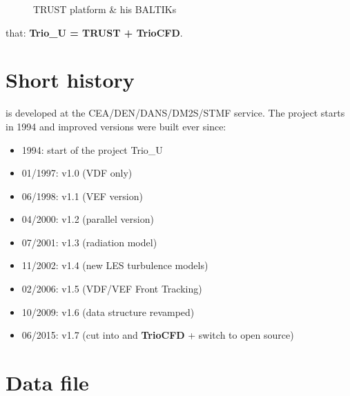 \begin{figure}[h!]
\begin{center}
\caption{TRUST platform \& his BALTIKs}
\label{TRUST}
\end{center}
\end{figure}

\Note that: \textbf{Trio\_U = TRUST + TrioCFD}.



\section{Short history}

\trust is developed at the CEA/DEN/DANS/DM2S/STMF service.
The project starts in 1994 and improved versions were built ever since:
\begin{itemize}
\item 1994: start of the project Trio\_U
\item 01/1997: v1.0 (VDF only)
\item 06/1998: v1.1 (VEF version)
\item 04/2000: v1.2 (parallel version)
\item 07/2001: v1.3 (radiation model)
\item 11/2002: v1.4 (new LES turbulence models)
\item 02/2006: v1.5 (VDF/VEF Front Tracking)
\item 10/2009: v1.6 (data structure revamped)
\item 06/2015: v1.7 (cut into \trust and \textbf{TrioCFD} + switch to open source)
\end{itemize}




\section{Data file}

